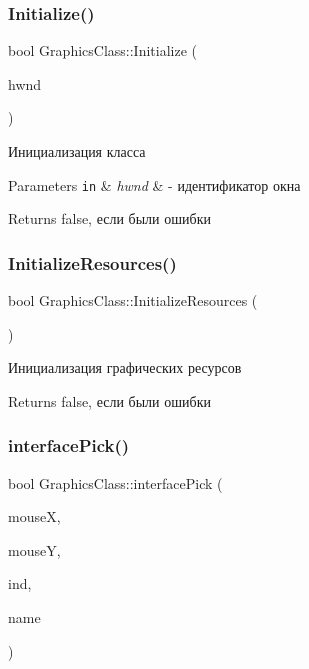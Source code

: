 \subsubsection{\texorpdfstring{Initialize()}{Initialize()}}
{\footnotesize\ttfamily bool Graphics\+Class\+::\+Initialize (\begin{DoxyParamCaption}\item[{H\+W\+ND}]{hwnd }\end{DoxyParamCaption})}



Инициализация класса 


\begin{DoxyParams}[1]{Parameters}
\mbox{\tt in}  & {\em hwnd} & -\/ идентификатор окна \\
\hline
\end{DoxyParams}
\begin{DoxyReturn}{Returns}
false, если были ошибки 
\end{DoxyReturn}
\mbox{\label{class_graphics_class_a4a1ea1f46cf5bb17349c6ccfb7de023c}} 
\subsubsection{\texorpdfstring{Initialize\+Resources()}{InitializeResources()}}
{\footnotesize\ttfamily bool Graphics\+Class\+::\+Initialize\+Resources (\begin{DoxyParamCaption}{ }\end{DoxyParamCaption})}



Инициализация графических ресурсов 

\begin{DoxyReturn}{Returns}
false, если были ошибки 
\end{DoxyReturn}
\mbox{\label{class_graphics_class_a2a4254477fe33e4a44e823d2a0703c38}} 
\subsubsection{\texorpdfstring{interface\+Pick()}{interfacePick()}}
{\footnotesize\ttfamily bool Graphics\+Class\+::interface\+Pick (\begin{DoxyParamCaption}\item[{int}]{mouseX,  }\item[{int}]{mouseY,  }\item[{int \&}]{ind,  }\item[{std\+::string \&}]{name }\end{DoxyParamCaption})\hspace{0.3cm}{\ttfamily [private]}}

